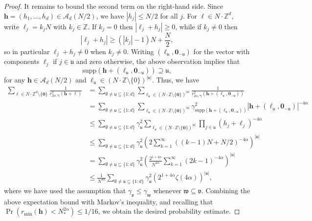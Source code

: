 \documentclass[a4paper,11pt]{article}
\newcommand{\bszero}{\boldsymbol{0}}
\newcommand{\bsh}{\boldsymbol{h}}
\newcommand{\bsl}{\boldsymbol{\ell}}
\newcommand{\bsgamma}{\boldsymbol{\gamma}}
\newcommand{\ZZ}{\mathbb{Z}}
\newcommand{\Acal}{\mathcal{A}}
\newcommand{\fraku}{\mathfrak{u}}
\newcommand{\abs}[1]{\left\vert#1\right\vert}
\begin{document}
\begin{proof}
    It remains to bound the second term on the right-hand side. 
    Since $\bsh=(h_1,\dots,h_d)\in \Acal_d(N/2)$, we have $|h_j|\le N/2$ for all $j$.  
    For $\bsl\in N\cdot \ZZ^d$, write $\ell_j = k_jN$ with $k_j\in\ZZ$.  
    If $k_j=0$ then $|\ell_j+h_j| \geq 0$, 
    while if $k_j\neq 0$ then
    \[
        |\ell_j+h_j| \geq (|k_j|-1)N + \frac{N}{2},
    \]
    so in particular $\ell_j+h_j \neq 0$ when $k_j\neq 0$.
    Writing $(\bsl_{\fraku},\bszero_{-\fraku})$ 
    for the vector with components $\ell_j$ if $j\in\fraku$ and zero otherwise, the above observation implies that
    \[ \mathrm{supp}(\bsh+(\bsl_{\fraku},\bszero_{-\fraku})) \supseteq \fraku, \]
    for any $\bsh\in \Acal_d(N/2)$ and $\bsl_{\fraku}\in (N\cdot \ZZ\setminus \{0\})^{|\fraku|}$. Thus, we have
    \begin{align*}
    \sum_{\bsl\in N\cdot \ZZ^d\setminus\{\bszero\}}\frac{1}{r^2_{2\alpha, \bsgamma}(\bsh+\bsl)} 
    & = 
    \sum_{\emptyset \neq \fraku \subseteq \{1{:}d\}}
    \sum_{\bsl_{\fraku}\in (N\cdot \ZZ\setminus\{\bszero\})^{\abs{\fraku}}}\frac{1}{r^2_{2\alpha, \bsgamma}(\bsh+(\bsl_{\fraku},\bszero_{-\fraku}))}\\
    &= \sum_{\emptyset \neq \fraku \subseteq \{1{:}d\}} 
     \sum_{\bsl_{\fraku}\in (N\cdot \ZZ\setminus\{\bszero\})^{\abs{\fraku}}} 
     \gamma^{2}_{\mathrm{supp}(\bsh+(\bsl_{\fraku},\bszero_{-\fraku}))}
    \abs{\bsh+(\bsl_{\fraku},\bszero_{-\fraku})}^{-4\alpha}\\
    &\le \sum_{\emptyset \neq \fraku \subseteq \{1{:}d\}} \gamma^{2}_{\fraku}
    \sum_{\bsl_{\fraku}\in (N\cdot \ZZ\setminus\{\bszero\})^{\abs{\fraku}}}
    \prod_{j\in\fraku}(h_j + \ell_j)^{-4\alpha}\\
    &\le \sum_{\emptyset \neq \fraku \subseteq \{1{:}d\}} \gamma^{2}_{\fraku}
    \left(2\sum_{k=1}^\infty ((k-1)N+N/2)^{-4\alpha}\right)^{\abs{\fraku}}\\
    &= \sum_{\emptyset \neq \fraku \subseteq \{1{:}d\}} \gamma^{2}_{\fraku}
    \left(\frac{2^{1+4\alpha}}{N^{4\alpha}}\sum_{k=1}^\infty (2k-1)^{-4\alpha}\right)^{\abs{\fraku}}\\
    &\le \frac{1}{N^{4\alpha}} 
    \sum_{\emptyset \neq \fraku \subseteq \{1{:}d\}} \gamma^{2}_{\fraku}
    \left(2^{1+4\alpha}\zeta(4\alpha)\right)^{\abs{\fraku}},
    \end{align*}
    where we have used the assumption that $\gamma_{\mathfrak{v}}\le\gamma_{\mathfrak{w}}$ 
    whenever $\mathfrak{w}\subseteq \mathfrak{v}$. Combining the above expectation bound with Markov’s inequality, and recalling that $\Pr(r_{\min}(\bsh)< N^{2\alpha}_*)\leq 1/16$, we obtain the desired probability estimate.
\end{proof}
\end{document}
